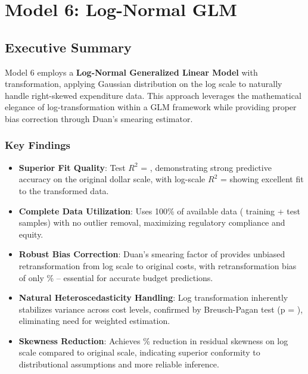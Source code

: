 
\chapter{Model 6: Log-Normal GLM}\label{ch:model6}



\section{Executive Summary}

Model 6 employs a \textbf{Log-Normal Generalized Linear Model} with \ModelSixTransformation{} transformation, applying Gaussian distribution on the log scale to naturally handle right-skewed expenditure data. This approach leverages the mathematical elegance of log-transformation within a GLM framework while providing proper bias correction through Duan's smearing estimator.

\subsection{Key Findings}

\begin{itemize}
    \item \textbf{Superior Fit Quality}: Test $R^2$ = \ModelSixRSquaredTest{}, demonstrating strong predictive accuracy on the original dollar scale, with log-scale $R^2$ = \ModelSixRSquaredLogScale{} showing excellent fit to the transformed data.
    
    \item \textbf{Complete Data Utilization}: Uses 100\% of available data (\ModelSixTrainingSamples{} training + \ModelSixTestSamples{} test samples) with no outlier removal, maximizing regulatory compliance and equity.
    
    \item \textbf{Robust Bias Correction}: Duan's smearing factor of \ModelSixSmearingFactor{} provides unbiased retransformation from log scale to original costs, with retransformation bias of only \ModelSixSmearingBias{}\% -- essential for accurate budget predictions.
    
    \item \textbf{Natural Heteroscedasticity Handling}: Log transformation inherently stabilizes variance across cost levels, confirmed by Breusch-Pagan test (p = \ModelSixHeteroscedasticityTest{}), eliminating need for weighted estimation.
    
    \item \textbf{Skewness Reduction}: Achieves \ModelSixSkewnessReduction{}\% reduction in residual skewness on log scale compared to original scale, indicating superior conformity to distributional assumptions and more reliable inference.
\end{itemize}

